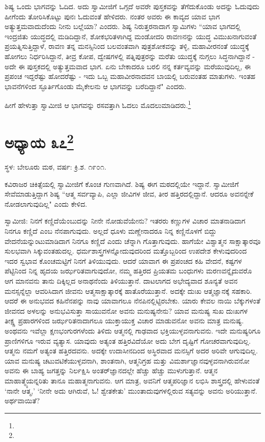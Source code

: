 ಶಿಷ್ಯ ಒಂದು ಭಾಗವನ್ನು ಓದಿದ. ಅದು ಸ್ವಾಮೀಜಿಗೆ ಒಗ್ಗದೆ ಅವರೇ ಪುಸ್ತಕವನ್ನು ತೆಗೆದುಕೊಂಡು ಅದನ್ನು ಓದುವುದು ಹೀಗೆಂದು ತೋರಿಸಿಕೊಟ್ಟು ಪುನಃ ಓದುವಂತೆ ಹೇಳಿದರು. ನಂತರ ಅವರು ಈ ಕಾವ್ಯದ ಯಾವ ಭಾಗ ಅತ್ಯುತ್ತಮವಾದುದೆಂದು ನೀನು ಬಲ್ಲೆಯಾ? ಎಂದರು. ಶಿಷ್ಯ ನಿರುತ್ತರನಾದಾಗ ಸ್ವಾಮಿಗಳು “ಯಾವ ಭಾಗದಲ್ಲಿ ಇಂದ್ರಜಿತು ಯುದ್ಧದಲ್ಲಿ ಮಡಿದಿದ್ದಾನೆ, ಶೋಕಭರಿತಳಾಗಿದ್ದ ಮಂಡೋದರಿ ರಾವಣನನ್ನು ಯುದ್ಧ ವಿಮುಖನಾಗುವಂತೆ ಪ್ರಯತ್ನಿಸುತ್ತಿದ್ದಾಳೆ, ರಾವಣ ತನ್ನ ಮನಸ್ಸಿನಿಂದ ಬಲವಂತವಾಗಿ ಪುತ್ರಶೋಕವನ್ನು ತಳ್ಳಿ, ಮಹಾವೀರನಂತೆ ಯುದ್ಧಕ್ಕೆ ಹೋಗಲು ನಿರ್ಧರಿಸಿದ್ದಾನೆ, ತೀವ್ರ ಕೋಪ, ದ್ವೇಷಗಳಲ್ಲಿ ಪತ್ನಿಪುತ್ರರನ್ನು ಮರೆತು ಯುದ್ಧಕ್ಕೆ ನುಗ್ಗಲು ಸಿದ್ಧನಾಗಿದ್ದಾನೆ - ಅದೇ ಈ ಪುಸ್ತಕದಲ್ಲಿ ಅತ್ಯುತ್ತಮವಾದ ಭಾಗ. ಏನು ಬೇಕಾದರೂ ಬರಲಿ ನನ್ನ ಕರ್ತವ್ಯವನ್ನು ಮರೆಯುವುದಿಲ್ಲ, ಈ ಪ್ರಪಂಚ ಇದ್ದರೆಷ್ಟು ಹೋದರೆಷ್ಟು - ಇದು ಒಬ್ಬ ಮಹಾವೀರನಾದವನ ಬಾಯಲ್ಲಿ ಬರುವಂತಹ ಮಾತುಗಳು. ಇಂತಹ ಭಾವನೆಗಳಿಂದ ಸ್ಫೂರ್ತಿಗೊಂಡು ಮೈಕೇಲನು ಆ ಭಾಗವನ್ನು ಬರೆದಿದ್ದಾನೆ" ಎಂದರು.

ಹೀಗೆ ಹೇಳುತ್ತಾ ಸ್ವಾಮೀಜಿ ಆ ಭಾಗವನ್ನು ರಸವತ್ತಾಗಿ ಓದಲು ಮೊದಲುಮಾಡಿದರು.\footnote{}

\newpage

\chapter[ಅಧ್ಯಾಯ ೩೭]{ಅಧ್ಯಾಯ ೩೭\protect\footnote{}}

\centerline{ಸ್ಥಳ: ಬೇಲೂರು ಮಠ, ವರ್ಷ: ಕ್ರಿ.ಶ. ೧೯೦೧.}

ಕವಿರಾಜರ ಚಿಕಿತ್ಸೆಯಲ್ಲಿ ಸ್ವಾಮೀಜಿಗೆ ಕೊಂಚ ಗುಣವಾಗಿದೆ. ಶಿಷ್ಯ ಈಗ ಮಠದಲ್ಲಿಯೇ ಇದ್ದಾನೆ. ಸ್ವಾಮೀಜಿಗೆ ಸೇವೆಮಾಡುತ್ತಿದ್ದಾಗ ಶಿಷ್ಯ “ಆತ್ಮ ಸರ್ವವ್ಯಾಪಿ, ಎಲ್ಲಾ ಜೀವಿಗಳ ಜೀವ, ತೀರ ಹತ್ತಿರದಲ್ಲಿದ್ದಾನೆ. ಆದರೂ ಅವನನ್ನೇಕೆ ನೋಡಲಾಗುವುದಿಲ್ಲ" ಎಂದು ಕೇಳಿದ.

ಸ್ವಾಮೀಜಿ: ನಿನಗೆ ಕಣ್ಣಿದೆಯೆಂಬುದನ್ನು ನೀನೇ ನೋಡುವೆಯೇನು? ಇತರರು ಕಣ್ಣುಗಳ ವಿಚಾರ ಮಾತನಾಡಿದಾಗ ನಿನಗೂ ಕಣ್ಣಿದೆ ಎಂಬ ನೆನಪಾಗುವುದು. ಅಲ್ಲದೆ ಧೂಳು ಮಣ್ಣೇನಾದರೂ ನಿನ್ನ ಕಣ್ಣಿನೊಳಗೆ ಬಿದ್ದು ವೇದನೆಯನ್ನುಂಟುಮಾಡಿದಾಗ ನಿನಗೂ ಕಣ್ಣಿದೆ ಎಂದು ಚೆನ್ನಾಗಿ ಗೊತ್ತಾಗುವುದು. ಹಾಗೆಯೇ ವಿಶ್ವಾತ್ಮನ ಸಾಕ್ಷಾತ್ಕಾರವೂ ಸುಲಭವಾಗಿ ಸಿಕ್ಕುವಂತಹುದಲ್ಲ. ಧರ್ಮಶಾಸ್ತ್ರಗಳನ್ನೋದುವುದರಿಂದ ಮತ್ತೊಬ್ಬರಿಂದ ಉಪದೇಶ ಕೇಳುವುದರಿಂದ ಇದರ ಸ್ವಭಾವ ಕೊಂಚಮಟ್ಟಿಗೆ ನಿನಗೆ ತಿಳಿಯುವುದು. ಆದರೆ ಯಾವಾಗ ಈ ಪ್ರಪಂಚದ ಕಹಿ ವೇದನೆ, ಕಷ್ಟಗಳ ಪೆಟ್ಟಿನಿಂದ ನಿನ್ನ ಹೃದಯ ಜರ್ಝರಿತವಾಗುವುದೋ, ನಮ್ಮ ಹತ್ತಿರದ ಪ್ರಿಯತಮ ಬಂಧುಗಳು ಮರಣವನ್ನೈದುವರೊ ಆಗ ಮಾನವನು ತಾನು ದಿಕ್ಕಿಲ್ಲದ ಅನಾಥನೆಂದು ತಿಳಿಯುತ್ತಾನೆ. ದಾಟಲಾಗದ ಅಭೇದ್ಯವಾದ ಶೂನ್ಯತೆ ಅವನ ಮನಸ್ಸನ್ನೆಲ್ಲಾ ಆವರಿಸಿದಾಗ ಜೀವನು ಆತ್ಮಸಾಕ್ಷಾತ್ಕಾರಕ್ಕೆ ಹಾತೊರೆಯುತ್ತಾನೆ. ಅದಕ್ಕೇ ದುಃಖ ಆತ್ಮಜ್ಞಾನಕ್ಕೆ ಸಹಕಾರಿ. ಆದರೆ ಈ ಅನುಭವದ ಕಹಿನೆನಪನ್ನು ನಾವು ಯಾವಾಗಲೂ ನೆನಪಿನಲ್ಲಿಟ್ಟಿರಬೇಕು. ಯಾರು ಕೇವಲ ನಾಯಿ ಬೆಕ್ಕುಗಳಂತೆ ಜೀವನದ ಅಳಲನ್ನು ಅನುಭವಿಸುತ್ತಾ ಸಾಯುವನೋ ಅವನು ಮನುಷ್ಯನೇನು? ಯಾವ ಮನುಷ್ಯ ಸುಖ ದುಃಖಗಳ ತೀಕ್ಷ್ಣ ಪ್ರಹಾರಗಳಿಂದ ಜರ್ಝರಿತನಾದಾಗಲೂ ಯುಕ್ತಾಯುಕ್ತ ವಿಚಾರ ಮಾಡುವನೋ ಅವನು ಮಾತ್ರ ಮನುಷ್ಯ. ಅಂಥವನು ಇವೆಲ್ಲಾ ಕ್ಷಣಭಂಗುರಗಳೆಂದು ತಿಳಿದು ಆತ್ಮನಲ್ಲಿ ಗಾಢವಾದ ಭಕ್ತಿಯುಳ್ಳವನಾಗುವನು. ಇದೇ ಮನುಷ್ಯರಿಗೂ ಪ್ರಾಣಿಗಳಿಗೂ ಇರುವ ವ್ಯತ್ಯಾಸ. ಯಾವುದು ಅತ್ಯಂತ ಹತ್ತಿರವಿದೆಯೋ ಅದು ಬೇಗ ದೃಷ್ಟಿಗೆ ಗೋಚರವಾಗುವುದಿಲ್ಲ. ಆತ್ಮನು ನಮಗೆ ಅತ್ಯಂತ ಹತ್ತಿರದವನು. ಅದಕ್ಕೇ ಉದಾಸೀನದಿಂದ ಅಸ್ಥಿರವಾದ ಮನಸ್ಸಿಗೆ ಅದರ ಅರಿವೇ ಆಗುವುದಿಲ್ಲ. ಯಾವ ಮನುಷ್ಯ ಚಟುವಟಿಕೆಯುಳ್ಳವನಾಗಿ, ಶಾಂತನಾಗಿ, ಆತ್ಮನಿಗ್ರಹ ಮತ್ತು ವಿಮರ್ಶಾಜ್ಞಾನವುಳ್ಳವನಾಗಿರುವನೋ ಅವನು ಈ ಬಾಹ್ಯ ಜಗತ್ತನ್ನು ನಿರ್ಲಕ್ಷಿಸಿ ಅಂತರ್‌ಜ್ಞಾನದಲ್ಲೇ ಹೆಚ್ಚು ಹೆಚ್ಚು ಮುಳುಗುತ್ತಾನೆ. ಆತ್ಮನ ಮಾಹಾತ್ಮ್ಯೆಯನ್ನರಿತು ತಾನೂ ಮಹಾತ್ಮನಾಗುವನು. ಆಗ ಮಾತ್ರ, ಅವನಿಗೆ ಆತ್ಮಪರಿಜ್ಞಾನ ಲಭಿಸಿ ಶಾಸ್ತ್ರದಲ್ಲಿ ಹೇಳುವಂತೆ ‘ನಾನೇ ಆತ್ಮ,’ ‘ನೀನೇ ಅದು ಆಗಿರುವೆ, ಓ! ಶ್ವೇತಕೇತು’ ಮುಂತಾದುವುಗಳಲ್ಲಿರುವ ಸತ್ಯವನ್ನು ಅವನು ಅರಿಯುತ್ತಾನೆ. ಅರ್ಥವಾಯಿತೆ?

